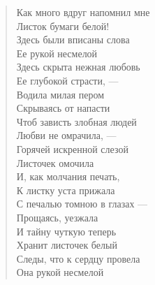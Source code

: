 \begin{verse}
\begin{altverse}
Как много вдруг напомнил мне\\
     Листок бумаги белой!\\
Здесь были вписаны слова \\
     Ее рукой несмелой\ldotst\\
Здесь скрыта нежная любовь\\
     Ее глубокой страсти, ---\\
Водила милая пером\\
     Скрываясь от напасти\ldotst\\
Чтоб зависть злобная людей\\
     Любви не омрачила, ---\\
Горячей искренной слезой\\
     Листочек омочила\ldotst\\
И, как молчания печать,\\
     К листку уста прижала\ldotst\\
С печалью томною в глазах ---\\
     Прощаясь, уезжала\ldotst\\
И тайну чуткую теперь\\
     Хранит листочек белый\\
Следы, что к сердцу провела\\
     Она рукой несмелой\ldotst\\
\end{altverse}
\end{verse}

\newpage
\vspace*{0cm}



